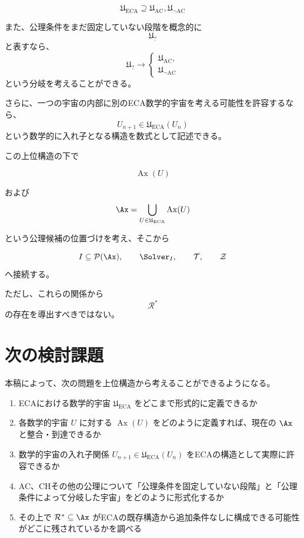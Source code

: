 \documentclass[11pt,a4paper]{article}
\begin{document}
\[
\boxed{
\mathfrak{U}_{\mathrm{ECA}}
\supseteq
\mathfrak{U}_{\mathrm{AC}},
\mathfrak{U}_{\neg\mathrm{AC}}
}
\]

また、公理条件をまだ固定していない段階を概念的に
\[
\mathfrak{U}_{?}
\]
と表すなら、
\[
\mathfrak{U}_{?}
\longrightarrow
\begin{cases}
\mathfrak{U}_{\mathrm{AC}},\\
\mathfrak{U}_{\neg\mathrm{AC}}
\end{cases}
\]
という分岐を考えることができる。

さらに、一つの宇宙の内部に別のECA数学的宇宙を考える可能性を許容するなら、
\[
U_{n+1}\in\mathfrak{U}_{\mathrm{ECA}}(U_n)
\]
という数学的に入れ子となる構造を数式として記述できる。

この上位構造の下で

\[
\operatorname{Ax}(U)
\]

および
\[
\Ax = \bigcup_{U\in\mathfrak{U}_{\mathrm{ECA}}} \operatorname{Ax}(U)
\]

という公理候補の位置づけを考え、そこから

\[
I\subseteq\mathcal{P}(\Ax),
\qquad
\Solver_I,
\qquad
\mathcal{T},
\qquad
\mathcal{Z}
\]
へ接続する。

ただし、これらの関係から
\[
\mathcal{R}^{*}
\]
の存在を導出すべきではない。

\section{次の検討課題}

本稿によって、次の問題を上位構造から考えることができるようになる。

\begin{enumerate}
    \item ECAにおける数学的宇宙 \(\mathfrak{U}_{\mathrm{ECA}}\) をどこまで形式的に定義できるか
    \item 各数学的宇宙 \(U\) に対する $\operatorname{Ax}(U)$ をどのように定義すれば、現在の \(\Ax\) と整合・到達できるか
    \item 数学的宇宙の入れ子関係 $U_{n+1}\in\mathfrak{U}_{\mathrm{ECA}}(U_n)$ をECAの構造として実際に許容できるか
    \item AC、CHその他の公理について「公理条件を固定していない段階」と「公理条件によって分岐した宇宙」をどのように形式化するか
    \item その上で $\mathcal{R}^{*}\subseteq\Ax$ がECAの既存構造から追加条件なしに構成できる可能性がどこに残されているかを調べる
\end{enumerate}
\end{document}
